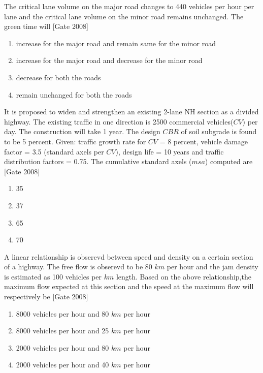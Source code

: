		The critical lane volume on the major road changes to 440 vehicles per hour per lane and the critical lane volume on the minor road remains unchanged. The green time will  \hfill [Gate 2008]
\begin{multicols}{2}
	\begin{enumerate}
		\item increase for the major road and remain same for the minor road
		\item increase for the major road and decrease for the minor road

		\item decrease for both the roads
		\item remain unchanged for both the roads
	\end{enumerate}
\end{multicols}
	\item It is proposed to widen and strengthen an existing 2-lane NH section as a divided highway. The existing traffic in one direction is 2500 commercial vehicles($CV$) per day. The construction will take 1 year. The design $CBR$ of soil subgrade is found to be 5 percent. Given: traffic growth rate for $CV$ = 8 percent, vehicle damage factor = 3.5 (standard axels per $CV$), design life = 10 years and traffic distribution factors = 0.75. The cumulative standard axels ($msa$) computed are  \hfill [Gate 2008]
\begin{multicols}{4}
	\begin{enumerate}
		\item 35
		\item 37
		\item 65
		\item 70
	\end{enumerate}
\end{multicols}	
	\item A linear relationship is obserevd between speed and density on a certain section of a highway. The free flow is obserevd to be 80 $km$ per hour and the jam density is estimated as 100 vehicles per $km$ length. Based on the above relationship,the maximum flow expected at this section and the speed at the maximum flow will respectively be  \hfill [Gate 2008]
\begin{multicols}{2} 
	\begin{enumerate}
		\item 8000 vehicles per hour and 80 $km$ per hour
		\item 8000 vehicles per hour and 25 $km$ per hour
		\item 2000 vehicles per hour and 80 $km$ per hour
		\item 2000 vehicles per hour and 40 $km$ per hour
	\end{enumerate}
\end{multicols}	
